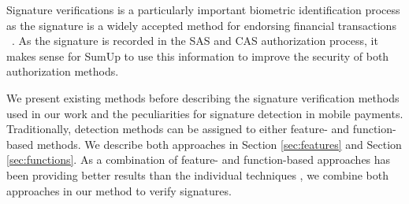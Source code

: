 \documentclass[a4paper, oneside]{csthesis}
\begin{document}
Signature verifications is a particularly important biometric identification process as the signature is a widely accepted method for endorsing financial transactions ~\cite{1227706}.
As the signature is recorded in the SAS and CAS authorization process, it makes sense for SumUp to use this information to improve the security of both authorization methods.

We present existing methods before describing the signature verification methods used in our work and the peculiarities for signature detection in mobile payments.
Traditionally, detection methods can be assigned to either feature- and function-based methods. We describe both approaches in Section \ref{sec:features} and Section \ref{sec:functions}. As a combination of feature- and function-based approaches has been providing better results than the individual techniques \cite{fierrez2005line}, we combine both approaches in our method to verify signatures.



\end{document}
